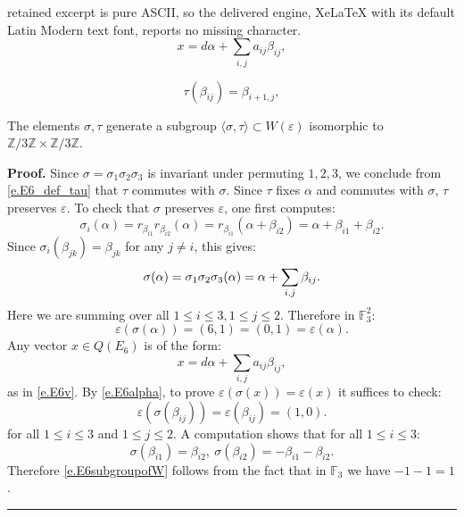 \documentclass[10pt,a4paper]{amsart}
\newcommand{\bF}{\mathbb{F}}
\newcommand{\bZ}{\mathbb{Z}}
\newcommand{\eps}{\varepsilon}
\newenvironment{proof}[1][Proof]{\textbf{#1.} }{\ \rule{0.5em}{0.5em}}
\begin{document}
retained excerpt is pure ASCII, so the delivered engine, XeLaTeX with its default Latin Modern text font, reports no missing character.
\begin{equation}\label{e.E6v}
    x = d \alpha + \sum_{i,j} a_{ij}\beta_{ij},
\end{equation}

\begin{equation}\label{e.E6_def_tau}
    \tau(\beta_{ij}) = \beta_{i+1,j},
\end{equation}

\begin{lemma}
    The elements $\sigma,\tau$ generate a subgroup $\langle \sigma,\tau\rangle \subset W(\eps)$ isomorphic to $\bZ/3\bZ \times \bZ/3\bZ$. 
\end{lemma}

\begin{proof}
    Since $\sigma = \sigma_1\sigma_2\sigma_3$ is invariant under permuting $1,2,3$, we conclude from \eqref{e.E6_def_tau} that $\tau$ commutes with $\sigma$. Since $\tau$ fixes $\alpha$ and commutes with $\sigma$, $\tau$ preserves $\eps$. To check that $\sigma$ preserves $\eps$, one first computes:
    $$\sigma_i(\alpha) = r_{\beta_{i1}}r_{\beta_{i2}}(\alpha) = r_{\beta_{i1}}(\alpha +\beta_{i2}) =\alpha + \beta_{i1} + \beta_{i2}.$$
    Since $\sigma_i(\beta_{jk}) = \beta_{jk}$ for any $j\neq i$, this gives:
    \begin{equation}\label{e.E6sigmaalpha}
    \sigma(\alpha) = \sigma_1 \sigma_2\sigma_3(\alpha) = \alpha + \sum_{\tiny i,j} \beta_{ij}.
    \end{equation}
    Here we are summing over all $1\leq i\leq 3, 1\leq j \leq 2$. Therefore in $\bF^2_3$:
    \begin{equation}\label{e.E6alpha}
        \eps(\sigma(\alpha))=(6,1) = (0,1) = \eps(\alpha).
    \end{equation} 
    Any vector $x\in Q(E_6)$ is of the form:
    $$ x =  d \alpha + \sum_{i,j} a_{ij}\beta_{ij},$$
    as in \eqref{e.E6v}. By \eqref{e.E6alpha}, to prove $\eps(\sigma(x)) = \eps(x)$ it suffices to check:
    \begin{equation}\label{e.E6subgroupofW}
        \eps(\sigma(\beta_{ij})) = \eps( \beta_{ij})= (1,0).
    \end{equation}
    for all $1\leq i\leq 3$ and $1\leq j\leq 2$. A computation shows that for all $1\leq i\leq 3$: 
    \begin{equation}\label{e.E6sigmabeta}
    \sigma(\beta_{i1}) = \beta_{i2},\  \sigma(\beta_{i2}) = -\beta_{i1}-\beta_{i2}.
    \end{equation}
    Therefore \eqref{e.E6subgroupofW} follows from the fact that in $\bF_3$ we have $-1 -1=1$.
\end{proof}
\end{document}
